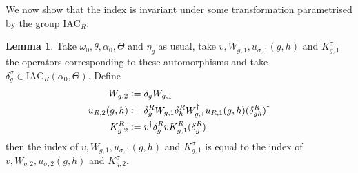 \documentclass[12pt,a4paper,twoside]{article}
\newcommand{\defeq}{\vcentcolon=}
\theoremstyle{definition}
\newtheorem{lemma}[theorem]{Lemma}
\numberwithin{equation}{section}
\begin{document}
We now show that the index is invariant under some transformation parametrised by the group $\textrm{IAC}_R$:
\begin{lemma}\label{lem:TransformationUnderDelta}
	Take $\omega_0,\theta,\alpha_0,\Theta$ and $\eta_g$ as usual, take $v,W_{g,1},u_{\sigma,1}(g,h)$ and $K_{g,1}^\sigma$ the operators corresponding to these automorphisms and take $\delta^\sigma_g\in\textrm{IAC}_R(\alpha_0,\Theta)$. Define
	\begin{align}
		W_{g,2}&\defeq\delta_g W_{g,1}\\
		u_{R,2}(g,h)&\defeq \delta_g^R W_{g,1}\delta_h^R W_{g,1}^\dagger u_{R,1}(g,h)(\delta_{gh}^R)^\dagger\\
		K^R_{g,2}&\defeq v^\dagger \delta_g^R v K_{g,1}^R (\delta_g^R)^\dagger
	\end{align}
	then the index of $v,W_{g,1},u_{\sigma,1}(g,h)$ and $K_{g,1}^\sigma$ is equal to the index of $v,W_{g,2},u_{\sigma,2}(g,h)$ and $K_{g,2}^\sigma$.
\end{lemma}
\end{document}
